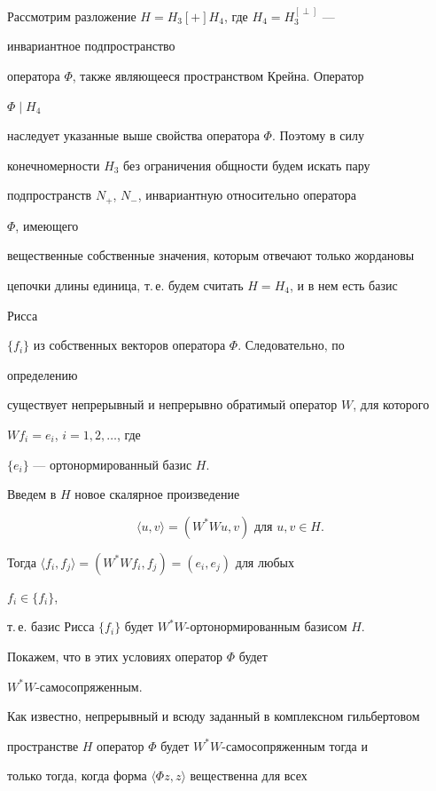 Рассмотрим разложение $H=H_3[+]H_4$, где $H_4=H_3^{[\perp]}$ ---


инвариантное подпространство


оператора $\Phi$, также являющееся пространством Крейна. Оператор


$\Phi\mid H_4$


наследует указанные выше свойства оператора $\Phi$. Поэтому в силу


конечномерности $H_3$ без ограничения общности будем искать пару


подпространств $N_+$, $N_-$, инвариантную относительно оператора


$\Phi$, имеющего


вещественные собственные значения, которым отвечают только жордановы


цепочки длины единица, т.\,е. будем считать $H=H_4$, и в нем есть базис


Рисса


$\{f_i\}$ из собственных векторов оператора $\Phi$. Следовательно, по


определению


существует непрерывный и непрерывно обратимый оператор $W$, для которого


$Wf_i=e_i$, $i=1,2,\dotsc$, где


$\{e_i\}$ --- ортонормированный базис $H$.





Введем в $H$ новое скалярное произведение


$$


\langle u,v\rangle=(W^*Wu,v)\text{ для }u,v\in H.


$$


Тогда $\langle f_i,f_j\rangle=(W^*Wf_i,f_j)=(e_i,e_j)$ для любых


$f_i\in\{f_i\}$,


т.\,е. базис Рисса $\{f_i\}$ будет $W^*W$-ортонормированным базисом $H$.





Покажем, что в этих условиях оператор $\Phi$ будет


$W^*W$-самосопряженным.


Как известно, непрерывный и всюду заданный в комплексном гильбертовом


пространстве $H$ оператор $\Phi$ будет $W^*W$-самосопряженным тогда и


только тогда, когда форма $\langle\Phi z,z\rangle$ вещественна для всех


